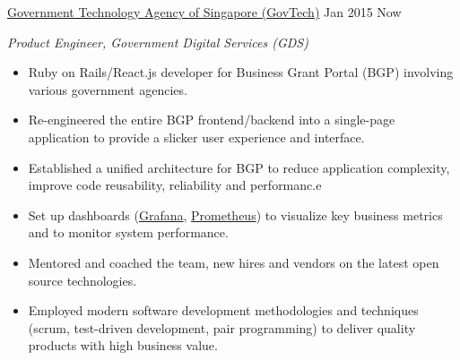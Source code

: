 \documentclass[]{cv} %
\begin{document}
\entry
{\href{https://www.tech.gov.sg/}{Government Technology Agency of Singapore (GovTech)}}
{Jan 2015 \to Now}
{\emph{Product Engineer, Government Digital Services (GDS)}
\begin{itemize}[topsep=2.5pt, parsep=1.5pt]
\item Ruby on Rails/React.js developer for Business Grant Portal (BGP) involving various government agencies.
\item Re-engineered the entire BGP frontend/backend into a single-page application to provide a slicker user experience and interface.
\item Established a unified architecture for BGP to reduce application complexity, improve code reusability, reliability and performanc.e
\item Set up dashboards (\href{http://grafana.org/}{Grafana}, \href{https://prometheus.io/}{Prometheus}) to visualize key business metrics and to monitor system performance.
\item Mentored and coached the team, new hires and vendors on the latest open source technologies.
\item Employed modern software development methodologies and techniques (scrum, test-driven development, pair programming) to deliver quality products with high business value. 
\end{itemize}}
\end{document}
